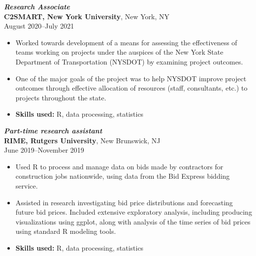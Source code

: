 \documentclass[letterpaper,12pt]{article}
\begin{document}
\textit{\textbf{Research Associate}} \\
\textbf{C2SMART, New York University},
New York, NY \\
August 2020--July 2021
\begin{itemize}
\item Worked towards development of a means for assessing the
  effectiveness of teams working on projects under the auspices of the
  New York State Department of Transportation (NYSDOT) by examining
  project outcomes.
\item One of the major goals of the project was to help NYSDOT improve
  project outcomes through effective allocation of resources (staff,
  consultants, etc.) to projects throughout the state.
\item \textbf{Skills used:} R, data processing, statistics
\end{itemize}

\iffalse
\textit{\textbf{Freelance statistician}} \\
Princeton, NJ \\
June 2020--Present
\begin{itemize}
\item I currently offer data analysis and programming services through
  freelancer sites such as Guru and Upwork.
\end{itemize}

\textit{\textbf{Independent mathematics tutor}} \\
Princeton, NJ \\
February 2020--March 2020
\begin{itemize}
\item Tutored students from Princeton High School and Princeton
  University in mathematics.
\end{itemize}
\fi

\textit{\textbf{Part-time research assistant}} \\
\textbf{RIME, Rutgers University},
New Brunswick, NJ \\
June 2019--November 2019
\begin{itemize}
\item Used R to process and manage data on bids made by contractors
  for construction jobs nationwide, using data from the Bid Express
  bidding service.
\item Assisted in research investigating bid price distributions and
  forecasting future bid prices. Included extensive exploratory
  analysis, including producing visualizations using ggplot, along
  with analysis of the time series of bid prices using standard R
  modeling tools.
\item \textbf{Skills used:} R, data processing, statistics
\end{itemize}
\end{document}
